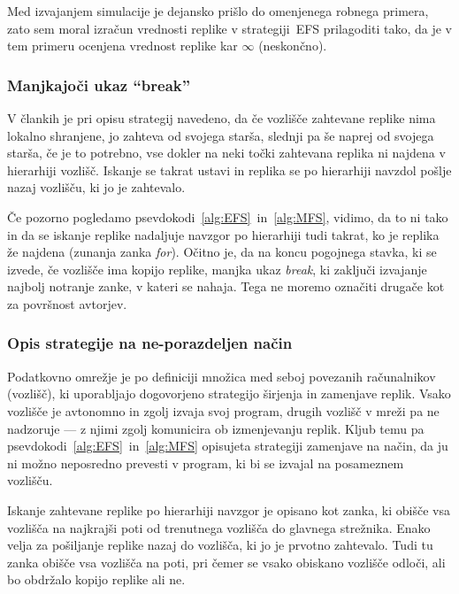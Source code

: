 \documentclass[a4paper, 12pt]{book}
\begin{document}
Med izvajanjem simulacije je dejansko prišlo do omenjenega robnega primera,
zato sem moral izračun vrednosti replike v strategiji~EFS prilagoditi tako,
da je v tem primeru ocenjena vrednost replike kar $\infty$ (neskončno).

\subsubsection{Manjkajoči ukaz ``break''}

V člankih je pri opisu strategij navedeno, da če vozlišče zahtevane replike
nima lokalno shranjene, jo zahteva od svojega starša, slednji pa še naprej
od svojega starša, če je to potrebno, vse dokler na neki točki zahtevana
replika ni najdena v hierarhiji vozlišč. Iskanje se takrat ustavi in replika
se po hierarhiji navzdol pošlje nazaj vozlišču, ki jo je zahtevalo.

Če pozorno pogledamo psevdokodi~\ref{alg:EFS}~in~\ref{alg:MFS}, vidimo, da to
ni tako in da se iskanje replike nadaljuje navzgor po hierarhiji tudi takrat,
ko je replika že najdena (zunanja zanka \textit{for}). Očitno je, da na koncu
pogojnega stavka, ki se izvede, če vozlišče ima kopijo replike, manjka ukaz
\textit{break}, ki zaključi izvajanje najbolj notranje zanke, v kateri se
nahaja. Tega ne moremo označiti drugače kot za površnost avtorjev.

\subsubsection{Opis strategije na ne-porazdeljen način}

Podatkovno omrežje je po definiciji množica med seboj povezanih računal\-nikov
(vozlišč), ki uporabljajo dogovorjeno strategijo širjenja in zamenjave replik.
Vsako vozlišče je avtonomno in zgolj izvaja svoj program, drugih vozlišč v
mreži pa ne nadzoruje --- z njimi zgolj komunicira ob izmenjevanju
replik. Kljub temu pa psevdokodi~\ref{alg:EFS}~in~\ref{alg:MFS}
opisujeta strategiji zamenjave na način, da ju ni možno neposredno prevesti v
program, ki bi se izvajal na posameznem vozlišču.

Iskanje zahtevane replike po hierarhiji navzgor je opisano kot zanka, ki obišče
vsa vozlišča na najkrajši poti od trenutnega vozlišča do glavnega strežnika.
Enako velja za pošiljanje replike nazaj do vozlišča, ki jo je prvotno
zahtevalo.
Tudi tu zanka obišče vsa vozlišča na poti, pri čemer se vsako obiskano vozlišče
odloči, ali bo obdržalo kopijo replike ali ne.
\end{document}
